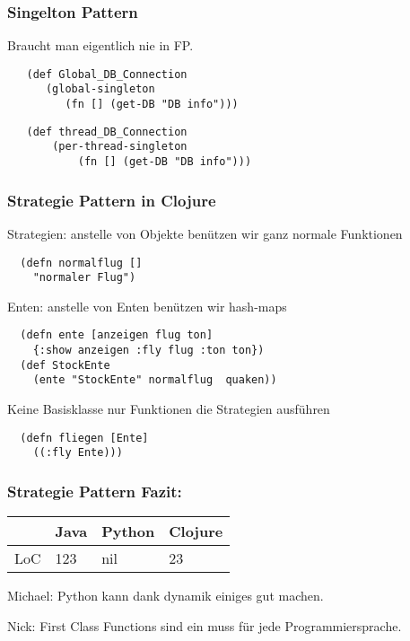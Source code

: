 \documentclass[compress, blue]{beamer}
\begin{document}

\begin{frame}[fragile]\frametitle{Singelton Pattern}


Braucht man eigentlich nie in FP. 
\pause
\begin{lstlisting}
   (def Global_DB_Connection 
      (global-singleton 
         (fn [] (get-DB "DB info")))
\end{lstlisting}
\pause
\begin{lstlisting}
   (def thread_DB_Connection 
       (per-thread-singleton 
           (fn [] (get-DB "DB info")))
\end{lstlisting}
\end{frame}
    
    
    



\begin{frame}[fragile]\frametitle{Strategie Pattern in Clojure}
 
Strategien: anstelle von Objekte benützen wir ganz normale Funktionen
\pause
\begin{lstlisting}
  (defn normalflug []
    "normaler Flug")
\end{lstlisting} 
\pause
Enten: anstelle von Enten  benützen wir hash-maps
\pause
\begin{lstlisting}
  (defn ente [anzeigen flug ton]
    {:show anzeigen :fly flug :ton ton})
  (def StockEnte 
    (ente "StockEnte" normalflug  quaken))
\end{lstlisting}
\pause
Keine Basisklasse nur Funktionen die Strategien ausführen 
\pause
\begin{lstlisting}
  (defn fliegen [Ente]
    ((:fly Ente)))
\end{lstlisting} 
\end{frame}





\begin{frame}\frametitle{Strategie Pattern Fazit:}
  \begin{tabular}{l | l l l}
     & Java &  Python & Clojure  \\
     \hline
    LoC & 123 &  nil & 23  \\
  \end{tabular}
  \vspace{.5cm}

  \begin{block}{Michael:}
    Python kann dank dynamik einiges gut machen.
  \end{block}

  \begin{block}{Nick: }
    First Class Functions sind ein muss für jede Programmiersprache.
  \end{block}
\end{frame}
\end{document}
